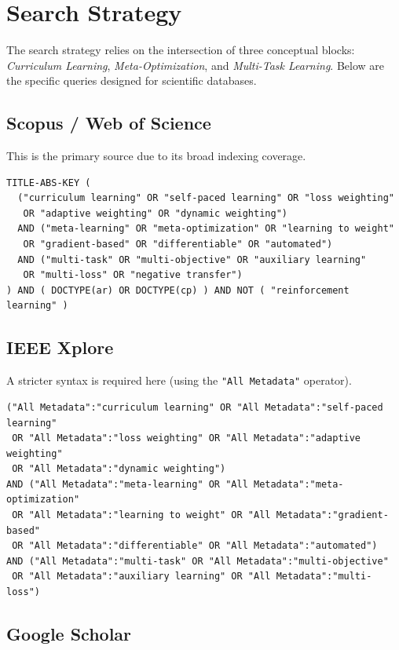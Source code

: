 \section{Search Strategy}

The search strategy relies on the intersection of three conceptual blocks:
\emph{Curriculum Learning}, \emph{Meta-Optimization}, and \emph{Multi-Task
	Learning}. Below are the specific queries designed for scientific databases.

\subsection{Scopus / Web of Science}

This is the primary source due to its broad indexing coverage.

\begin{verbatim}
TITLE-ABS-KEY (
  ("curriculum learning" OR "self-paced learning" OR "loss weighting"
   OR "adaptive weighting" OR "dynamic weighting")
  AND ("meta-learning" OR "meta-optimization" OR "learning to weight"
   OR "gradient-based" OR "differentiable" OR "automated")
  AND ("multi-task" OR "multi-objective" OR "auxiliary learning"
   OR "multi-loss" OR "negative transfer")
) AND ( DOCTYPE(ar) OR DOCTYPE(cp) ) AND NOT ( "reinforcement learning" )
\end{verbatim}

\subsection{IEEE Xplore}

A stricter syntax is required here (using the \texttt{"All Metadata"}
operator).

\begin{verbatim}
("All Metadata":"curriculum learning" OR "All Metadata":"self-paced learning"
 OR "All Metadata":"loss weighting" OR "All Metadata":"adaptive weighting"
 OR "All Metadata":"dynamic weighting")
AND ("All Metadata":"meta-learning" OR "All Metadata":"meta-optimization"
 OR "All Metadata":"learning to weight" OR "All Metadata":"gradient-based"
 OR "All Metadata":"differentiable" OR "All Metadata":"automated")
AND ("All Metadata":"multi-task" OR "All Metadata":"multi-objective"
 OR "All Metadata":"auxiliary learning" OR "All Metadata":"multi-loss")
\end{verbatim}

\subsection{Google Scholar}

